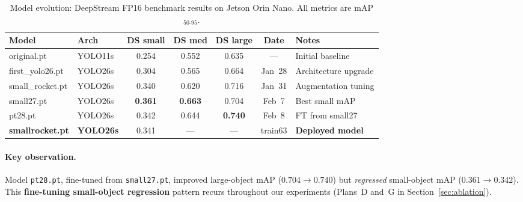 \documentclass[12pt, titlepage]{article}
\begin{document}
\begin{table}[H]
  \centering
  \caption{Model evolution: DeepStream FP16 benchmark results on
    Jetson Orin Nano.  All metrics are mAP$_{50\text{-}95}$.}
  \label{tab:evolution}
  \small
  \begin{tabular}{@{}llccccl@{}}
    \toprule
    \textbf{Model}          & \textbf{Arch}    & \textbf{DS small}       & \textbf{DS med} &
    \textbf{DS large}       & \textbf{Date}    & \textbf{Notes}                              \\
    \midrule
    original.pt             & YOLO11s          & 0.254                   & 0.552           &
    0.635                   & ---              & Initial baseline                            \\
    first\_yolo26.pt        & YOLO26s          & 0.304                   & 0.565           &
    0.664                   & Jan~28           & Architecture upgrade                        \\
    small\_rocket.pt        & YOLO26s          & 0.340                   & 0.620           &
    0.716                   & Jan~31           & Augmentation tuning                         \\
    small27.pt              & YOLO26s          & \textbf{0.361}          & \textbf{0.663}  &
    0.704                   & Feb~7            & Best small mAP                              \\
    pt28.pt                 & YOLO26s          & 0.342                   & 0.644           &
    \textbf{0.740}          & Feb~8            & FT from small27                             \\
    \textbf{smallrocket.pt} & \textbf{YOLO26s} & 0.341                   & ---             &
    ---                     & train63          & \textbf{Deployed model}                     \\
    \bottomrule
  \end{tabular}
\end{table}

\paragraph{Key observation.}  Model \texttt{pt28.pt}, fine-tuned from \texttt{small27.pt}, improved
large-object mAP ($0.704 \to 0.740$) but \emph{regressed} small-object mAP
($0.361 \to 0.342$). This \textbf{fine-tuning small-object regression} pattern
recurs throughout our experiments (Plans~D and~G in
Section~\ref{sec:ablation}).
\end{document}

